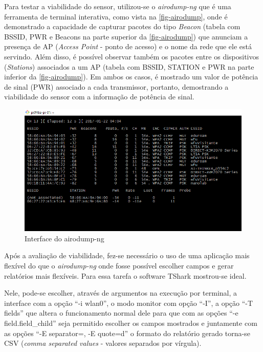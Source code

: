 Para testar a viabilidade do sensor, utilizou-se o \emph{airodump-ng} que é uma
ferramenta de terminal interativa, como vista na \autoref{fig-airodump}, onde é
demonstrado a capacidade de capturar pacotes do tipo \emph{Beacon} (tabela com
BSSID, PWR e Beacons na parte superior da \autoref{fig-airodump}) que anunciam
a presença de AP (\emph{Access Point} - ponto de acesso) e o nome da rede que
ele está servindo. Além disso, é possível observar também os pacotes entre os dispositivos (\emph{Stations})
associados a um AP (tabela com BSSID, STATION e PWR na parte inferior da
\autoref{fig-airodump}). Em ambos os casos, é mostrado um valor de potência de
sinal (PWR) associado a cada transmissor, portanto, demostrando a viabilidade
do sensor com a informação de potência de sinal.

\begin{figure}[htb]
	\caption{\label{fig-airodump}Interface do airodump-ng}
	\begin{center}
	\includegraphics[width=1\textwidth]{040-plataformas/RPi-WiFi-dongles/wifi-sniff-rpi/4-rpi-airodump.png}
	\end{center}
\end{figure}


Após a avaliação de viabilidade, fez-se necessário o uso de uma aplicação mais
flexível do que o \emph{airodump-ng} onde fosse possível escolher campos e gerar
relatórios mais flexíveis. Para essa tarefa o software TShark mostrou-se
ideal.

Nele, pode-se escolher, através de argumentos na execução por terminal, a
interface com a opção “-i wlan0”, o modo monitor com opção “-I”, a opção “-T
fields” que altera o funcionamento normal dele para que com as opções “-e
field.field\_child” seja permitido escolher os campos mostrados e juntamente com
as opções “-E separator=, -E quote=d” o formato do relatório gerado torna-se CSV
(\emph{comma separated values} - valores separados por vírgula).


